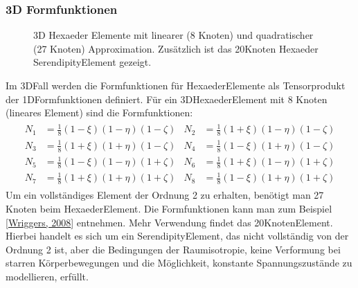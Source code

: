 \documentclass[letterpaper,10pt,german]{jupyterBook}
\let\sphinxpxdimen\pdfpxdimen\else\newdimen\sphinxpxdimen
\begin{document}
\subsubsection{3D Formfunktionen}
\label{\detokenize{chapters/chapter3/Ansatzfunktionen:id4}}
\begin{figure}[htbp]
\centering
\capstart

\noindent\sphinxincludegraphics[width=500\sphinxpxdimen]{{HexElements}.png}
\caption{3D Hexaeder Elemente mit linearer (8 Knoten) und quadratischer (27 Knoten) Approximation. Zusätzlich ist das 20\sphinxhyphen{}Knoten Hexaeder Serendipity\sphinxhyphen{}Element gezeigt.}\label{\detokenize{chapters/chapter3/Ansatzfunktionen:hexelements}}\end{figure}

\sphinxAtStartPar
Im 3D\sphinxhyphen{}Fall werden die Formfunktionen für Hexaeder\sphinxhyphen{}Elemente als Tensorprodukt der 1D\sphinxhyphen{}Formfunktionen definiert. Für ein 3D\sphinxhyphen{}Hexaeder\sphinxhyphen{}Element mit 8 Knoten (lineares Element) sind die Formfunktionen:
\begin{equation}\label{equation:chapters/chapter3/Ansatzfunktionen:3D_ShapeFunctions_H8}
\begin{split}\begin{align}
N_1 &= \frac{1}{8} (1 - \xi)(1 - \eta)(1 - \zeta) & N_2 &= \frac{1}{8} (1 + \xi)(1 - \eta)(1 - \zeta) \\
N_3 &= \frac{1}{8} (1 + \xi)(1 + \eta)(1 - \zeta) & N_4 &= \frac{1}{8} (1 - \xi)(1 + \eta)(1 - \zeta) \\
N_5 &= \frac{1}{8} (1 - \xi)(1 - \eta)(1 + \zeta) & N_6 &= \frac{1}{8} (1 + \xi)(1 - \eta)(1 + \zeta) \\
N_7 &= \frac{1}{8} (1 + \xi)(1 + \eta)(1 + \zeta) & N_8 &= \frac{1}{8} (1 - \xi)(1 + \eta)(1 + \zeta)
\end{align}\end{split}
\end{equation}
\sphinxAtStartPar
Um ein vollständiges Element der Ordnung 2 zu erhalten, benötigt man 27 Knoten beim Hexaeder\sphinxhyphen{}Element. Die Formfunktionen kann man zum Beispiel {[}\hyperlink{cite.quellen:id9}{Wriggers, 2008}{]} entnehmen. Mehr Verwendung findet das 20\sphinxhyphen{}Knoten\sphinxhyphen{}Element. Hierbei handelt es sich um ein Serendipity\sphinxhyphen{}Element, das nicht vollständig von der Ordnung 2 ist, aber die Bedingungen der Raumisotropie, keine Verformung bei starren Körperbewegungen und die Möglichkeit, konstante Spannungszustände zu modellieren, erfüllt.
\end{document}
